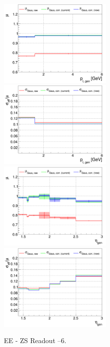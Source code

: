 \begin{figure}
\includegraphics[width=0.495\textwidth]{./plots_pdf/ECAL_plots/plotsPU/EE/ZS/pdf/GENPT/EEZS_GENPT_0000_0006_MuOverBins.pdf}
\includegraphics[width=0.495\textwidth]{./plots_pdf/ECAL_plots/plotsPU/EE/ZS/pdf/GENPT/EEZS_GENPT_0000_0006_EffSigmaOverBins.pdf}
\includegraphics[width=0.495\textwidth]{./plots_pdf/ECAL_plots/plotsPU/EE/ZS/pdf/GENETA/EEZS_GENETA_0000_0006_MuOverBins.pdf}
\includegraphics[width=0.495\textwidth]{./plots_pdf/ECAL_plots/plotsPU/EE/ZS/pdf/GENETA/EEZS_GENETA_0000_0006_EffSigmaOverBins.pdf}
\caption{EE - ZS Readout --6\GeV.}
\end{figure}

